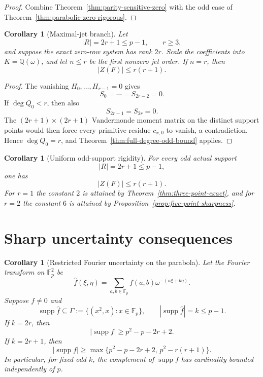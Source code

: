 \documentclass[11pt]{article}
\newtheorem{corollary}[theorem]{Corollary}
\newcommand{\F}{\mathbb F}
\newcommand{\Q}{\mathbb Q}
\newcommand{\supp}{\operatorname{supp}}
\begin{document}
\begin{proof}
Combine Theorem~\ref{thm:parity-sensitive-zero} with the odd case of
Theorem~\ref{thm:parabolic-zero-rigorous}.
\end{proof}

\begin{corollary}[Maximal-jet branch]
\label{cor:maximal-jet-odd-bound}
Let
\[
 |R|=2r+1\le p-1,\qquad r\ge3,
\]
and suppose the exact zero-row system has rank \(2r\).  Scale the
coefficients into \(K=\Q(\omega)\), and let \(n\le r\) be the first
nonzero jet order.  If \(n=r\), then
\[
 |Z(F)|\le r(r+1).
\]
\end{corollary}

\begin{proof}
The vanishing \(H_0,\ldots,H_{r-1}=0\) gives
\[
 S_0=\cdots=S_{2r-2}=0.
\]
If \(\deg Q_0<r\), then also
\[
 S_{2r-1}=S_{2r}=0.
\]
The \((2r+1)\times(2r+1)\) Vandermonde moment matrix on the distinct
support points would then force every primitive residue
\(c_{x,0}\) to vanish, a contradiction.  Hence \(\deg Q_0=r\), and
Theorem~\ref{thm:full-degree-odd-bound} applies.
\end{proof}

\begin{corollary}[Uniform odd-support rigidity]
\label{cor:odd-uniform-summary}
For every odd actual support
\[
 |R|=2r+1\le p-1,
\]
one has
\[
 |Z(F)|\le r(r+1).
\]
For \(r=1\) the constant \(2\) is attained by Theorem~\ref{thm:three-point-exact}, and for \(r=2\) the constant \(6\) is attained by Proposition~\ref{prop:five-point-sharpness}.
\end{corollary}

\section{Sharp uncertainty consequences}
\label{sec:consequences}

\begin{corollary}[Restricted Fourier uncertainty on the parabola]
\label{cor:restricted-parabola-rigorous}
Let the Fourier transform on \(\F_p^2\) be
\[
 \widehat f(\xi,\eta)
 =
 \sum_{a,b\in\F_p}
 f(a,b)\omega^{-(a\xi+b\eta)}.
\]
Suppose \(f\ne0\) and
\[
 \supp\widehat f
 \subseteq
 \Gamma:=\{(x^2,x):x\in\F_p\},
 \qquad
 |\supp\widehat f|=k\le p-1.
\]
If \(k=2r\), then
\[
 |\supp f|
 \ge
 p^2-p-2r+2.
\]
If \(k=2r+1\), then
\begin{equation}
 \boxed{
 |\supp f|
 \ge
 \max\{
 p^2-p-2r+2,\,
 p^2-r(r+1)
 \}.
 }
 \label{eq:restricted-parabola-odd-improved}
\end{equation}
In particular, for fixed odd \(k\), the complement of \(\supp f\) has
cardinality bounded independently of \(p\).
\end{corollary}
\end{document}
